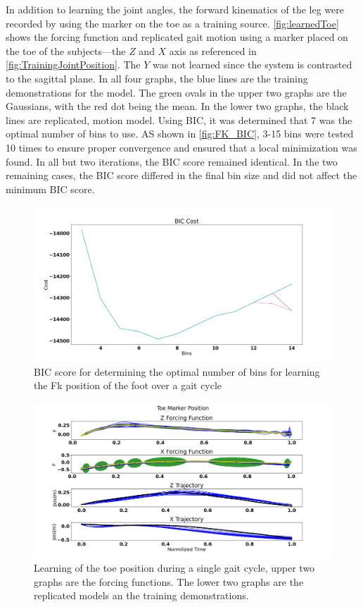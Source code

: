 In addition to learning the joint angles, the forward kinematics of the leg were recorded by using the marker on the toe as a training source. \autoref{fig:learnedToe} shows the forcing function and replicated gait motion using a marker placed on the toe of the subjects—the $Z$ and $X$ axis as referenced in \autoref{fig:TrainingJointPosition}. The $Y$ was not learned since the system is contrasted to the sagittal plane. In all four graphs, the blue lines are the training demonstrations for the model. The green ovals in the upper two graphs are the Gaussians, with the red dot being the mean. In the lower two graphs, the black lines are replicated, motion model. Using BIC, it was determined that 7 was the optimal number of bins to use. AS shown in \autoref{fig:FK_BIC}, 3-15 bins were tested 10 times to ensure proper convergence and ensured that a local minimization was found. In all but two iterations, the BIC score remained identical. In the two remaining cases, the BIC score differed in the final bin size and did not affect the minimum BIC score.


\begin{figure}
    \centering
    \includegraphics[scale=0.25]{images/gait_data/BIC_FK.png}
    \caption[FK BIC score]{BIC score for determining the optimal number of bins for learning the Fk position of the foot over a gait cycle}
    \label{fig:FK_BIC}
\end{figure}


\begin{figure}[!htb]
    \centering
    \includegraphics[scale=0.35]{images/gait_data/toe_maker_pos.png}
    \caption[Toe Marker Position]{Learning of the toe position during a single gait cycle, upper two graphs are the forcing functions. The lower two graphs are the replicated models an the training demonstrations.}
    \label{fig:learnedToe}
\end{figure}

